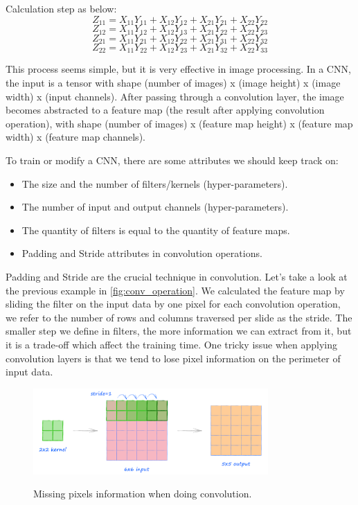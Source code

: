 	Calculation step as below:
	\[Z_{11} = X_{11}Y_{11} + X_{12}Y_{12} + X_{21}Y_{21} + X_{22}Y_{22}\]
	\[Z_{12} = X_{11}Y_{12} + X_{12}Y_{13} + X_{21}Y_{22} + X_{22}Y_{23}\]
	\[Z_{21} = X_{11}Y_{21} + X_{12}Y_{22} + X_{21}Y_{31} + X_{22}Y_{32}\]
	\[Z_{22} = X_{11}Y_{22} + X_{12}Y_{23} + X_{21}Y_{32} + X_{22}Y_{33}\]
	
	This process seems simple, but it is very effective in image processing. In a CNN, the input is a tensor with shape (number of images) x (image height) x (image width) x (input channels). After passing through a convolution layer, the image becomes abstracted to a feature map (the result after applying convolution operation), with shape (number of images) x (feature map height) x (feature map width) x (feature map channels).
	
	To train or modify a CNN, there are some attributes we should keep track on:
	\begin{itemize}
		\item The size and the number of filters/kernels (hyper-parameters).
		\item The number of input and output channels (hyper-parameters).
		\item The quantity of filters is equal to the quantity of feature maps.
		\item Padding and Stride attributes in convolution operations.
	\end{itemize}

	Padding and Stride are the crucial technique in convolution. Let’s take a look at the previous example in \ref{fig:conv_operation}. We calculated the feature map by sliding the filter on the input data by one pixel for each convolution operation, we refer to the number of rows and columns traversed per slide as the stride. The smaller step we define in filters, the more information we can extract from it, but it is a trade-off which affect the training time. One tricky issue when applying convolution layers is that we tend to lose pixel information on the perimeter of input data.
	
	\begin{figure}[H]
		\centering
		{\includegraphics[width=0.8\textwidth]{./hinhanh/chap3/padding.png}}
		\caption{Missing pixels information when doing convolution.}
		\label{fig:padding}
	\end{figure}

